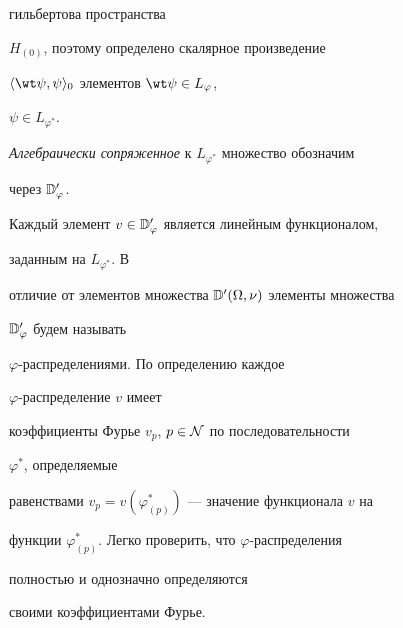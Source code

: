 гильбертова пространства 


$H_{(0)}$, поэтому определено скалярное произведение 


$\la\wt\psi,\psi\ra_0$ элементов $\wt\psi\in L_\varphi$, 


$\psi\in L_{\varphi^*}$. 


 


{\it Алгебраически сопряженное} к $L_{\varphi^*}$ множество обозначим 


через $\Bbb D'_\varphi$. 


Каждый элемент $v\in\Bbb D'_\varphi$ является линейным функционалом, 


заданным на $L_{\varphi^*}$. В 


отличие от элементов множества $\Bbb D'(\Omega,\nu)$ элементы множества 


$\Bbb D'_\varphi$ будем называть 


$\varphi$-распределениями. По определению каждое 


$\varphi$-распределение $v$ имеет 


коэффициенты Фурье $v_p$, $p\in\cal N$ по последовательности 


$\varphi^*$, определяемые 


равенствами $v_p=v(\varphi^*_{(p)})$ --- значение функционала $v$ на 


функции $\varphi^*_{(p)}$. Легко проверить, что $\varphi$-распределения 


полностью и однозначно определяются 


своими коэффициентами Фурье. 


 


